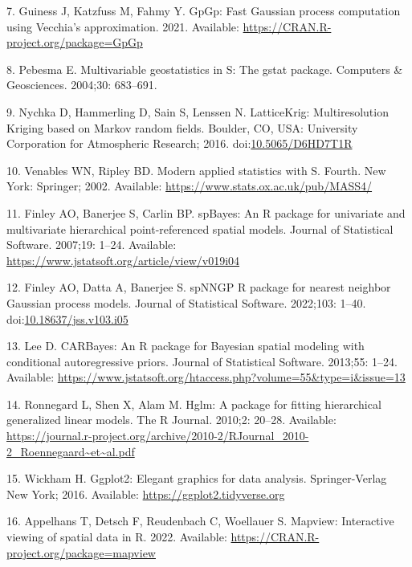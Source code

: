 \documentclass[10pt,letterpaper]{article}
\begin{document}
\leavevmode\hypertarget{ref-guiness2021gpgp}{}%
7. Guiness J, Katzfuss M, Fahmy Y. GpGp: Fast Gaussian process
computation using Vecchia's approximation. 2021. Available:
\url{https://CRAN.R-project.org/package=GpGp}

\leavevmode\hypertarget{ref-pebesma2004gstat}{}%
8. Pebesma E. Multivariable geostatistics in S: The gstat package.
Computers \& Geosciences. 2004;30: 683--691.

\leavevmode\hypertarget{ref-nychka2016latticekrig}{}%
9. Nychka D, Hammerling D, Sain S, Lenssen N. LatticeKrig:
Multiresolution Kriging based on Markov random fields. Boulder, CO, USA:
University Corporation for Atmospheric Research; 2016.
doi:\href{https://doi.org/10.5065/D6HD7T1R}{10.5065/D6HD7T1R}

\leavevmode\hypertarget{ref-venables2002S}{}%
10. Venables WN, Ripley BD. Modern applied statistics with S. Fourth.
New York: Springer; 2002. Available:
\url{https://www.stats.ox.ac.uk/pub/MASS4/}

\leavevmode\hypertarget{ref-finley2007spbayes}{}%
11. Finley AO, Banerjee S, Carlin BP. spBayes: An R package for
univariate and multivariate hierarchical point-referenced spatial
models. Journal of Statistical Software. 2007;19: 1--24. Available:
\url{https://www.jstatsoft.org/article/view/v019i04}

\leavevmode\hypertarget{ref-finley2002spnngp}{}%
12. Finley AO, Datta A, Banerjee S. spNNGP R package for nearest
neighbor Gaussian process models. Journal of Statistical Software.
2022;103: 1--40.
doi:\href{https://doi.org/10.18637/jss.v103.i05}{10.18637/jss.v103.i05}

\leavevmode\hypertarget{ref-lee2013carbayes}{}%
13. Lee D. CARBayes: An R package for Bayesian spatial modeling with
conditional autoregressive priors. Journal of Statistical Software.
2013;55: 1--24. Available:
\url{https://www.jstatsoft.org/htaccess.php?volume=55\&type=i\&issue=13}

\leavevmode\hypertarget{ref-ronnegard2010hglm}{}%
14. Ronnegard L, Shen X, Alam M. Hglm: A package for fitting
hierarchical generalized linear models. The R Journal. 2010;2: 20--28.
Available:
\url{https://journal.r-project.org/archive/2010-2/RJournal_2010-2_Roennegaard~et~al.pdf}

\leavevmode\hypertarget{ref-wickham2016ggplot2}{}%
15. Wickham H. Ggplot2: Elegant graphics for data analysis.
Springer-Verlag New York; 2016. Available:
\url{https://ggplot2.tidyverse.org}

\leavevmode\hypertarget{ref-appelhans2022mapview}{}%
16. Appelhans T, Detsch F, Reudenbach C, Woellauer S. Mapview:
Interactive viewing of spatial data in R. 2022. Available:
\url{https://CRAN.R-project.org/package=mapview}
\end{document}
